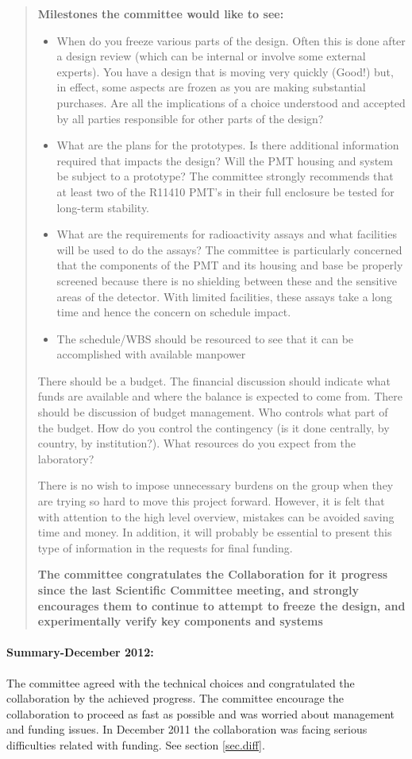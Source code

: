 \begin{quotation}
{\bf Milestones the committee would like to see:}
\begin{itemize}
\item When do you freeze various parts of the design. Often this is done after a design review (which can be internal or involve some external experts). You have a design that is moving very quickly (Good!) but, in effect, some aspects are frozen as you are making substantial purchases. Are all the implications of a choice understood and accepted by all parties responsible for other parts of the design?
\item What are the plans for the prototypes. Is there additional information required that impacts the design? Will the PMT housing and system be subject to a prototype? The committee strongly recommends that at least two of the R11410 PMT’s in their full enclosure be tested for long-term stability. 
\item What are the requirements for radioactivity assays and what facilities will be used to do the assays? The committee is particularly concerned that the components of the PMT and its housing and base be properly screened because there is no shielding between these and the sensitive areas of the detector. With limited facilities, these assays take a long time and hence the concern on schedule impact.
\item The schedule/WBS should be resourced to see that it can be accomplished with available manpower
\end{itemize}


There should be a budget. The financial discussion should indicate what funds are available and where the balance is expected to come from. There should be discussion of budget management. Who controls what part of the budget. How do you control the contingency (is it done centrally, by country, by institution?). What resources do you expect from the laboratory?

There is no wish to impose unnecessary burdens on the group when they are trying so hard to move this project forward. However, it is felt that with attention to the high level overview, mistakes can be avoided saving time and money. In addition, it will probably be essential to present this type of information in the requests for final funding.

{\bf	
The committee congratulates the Collaboration for it progress since the last Scientific Committee meeting, and strongly encourages them to continue to attempt to freeze the design, and experimentally verify key components and systems
}

\end{quotation}

\paragraph{Summary-December 2012:} The committee agreed with the technical choices and congratulated the collaboration by the achieved progress. The committee encourage the collaboration to proceed as fast as possible and was worried about management and  funding issues. In December 2011 the collaboration was facing serious difficulties related with funding. See section \ref{sec.diff}.


